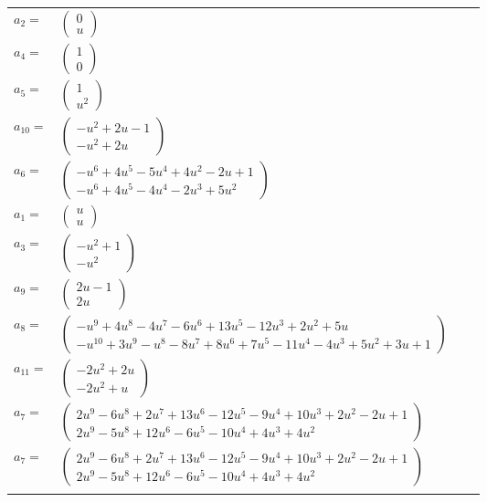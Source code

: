 \documentclass[1p]{elsarticle_modified}
\theoremstyle{definition}
\begin{document}
\begin{tabular}{m{7pt} m{180pt} m{7pt} m{180pt} }
\flushright $a_{2}=$&$\begin{pmatrix}0\\u\end{pmatrix}$ \\
\flushright $a_{4}=$&$\begin{pmatrix}1\\0\end{pmatrix}$ \\
\flushright $a_{5}=$&$\begin{pmatrix}1\\u^2\end{pmatrix}$ \\
\flushright $a_{10}=$&$\begin{pmatrix}- u^2+2 u-1\\- u^2+2 u\end{pmatrix}$ \\
\flushright $a_{6}=$&$\begin{pmatrix}- u^6+4 u^5-5 u^4+4 u^2-2 u+1\\- u^6+4 u^5-4 u^4-2 u^3+5 u^2\end{pmatrix}$ \\
\flushright $a_{1}=$&$\begin{pmatrix}u\\u\end{pmatrix}$ \\
\flushright $a_{3}=$&$\begin{pmatrix}- u^2+1\\- u^2\end{pmatrix}$ \\
\flushright $a_{9}=$&$\begin{pmatrix}2 u-1\\2 u\end{pmatrix}$ \\
\flushright $a_{8}=$&$\begin{pmatrix}- u^9+4 u^8-4 u^7-6 u^6+13 u^5-12 u^3+2 u^2+5 u\\- u^{10}+3 u^9- u^8-8 u^7+8 u^6+7 u^5-11 u^4-4 u^3+5 u^2+3 u+1\end{pmatrix}$ \\
\flushright $a_{11}=$&$\begin{pmatrix}-2 u^2+2 u\\-2 u^2+u\end{pmatrix}$ \\
\flushright $a_{7}=$&$\begin{pmatrix}2 u^9-6 u^8+2 u^7+13 u^6-12 u^5-9 u^4+10 u^3+2 u^2-2 u+1\\2 u^9-5 u^8+12 u^6-6 u^5-10 u^4+4 u^3+4 u^2\end{pmatrix}$\\ \flushright $a_{7}=$&$\begin{pmatrix}2 u^9-6 u^8+2 u^7+13 u^6-12 u^5-9 u^4+10 u^3+2 u^2-2 u+1\\2 u^9-5 u^8+12 u^6-6 u^5-10 u^4+4 u^3+4 u^2\end{pmatrix}$\\&\end{tabular}
\end{document}
